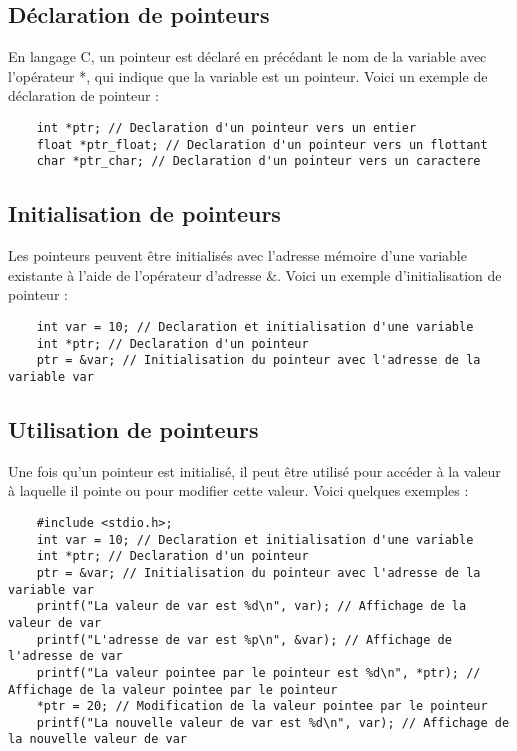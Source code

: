\subsection{Déclaration de pointeurs}

En langage C, un pointeur est déclaré en précédant le nom de la variable avec l'opérateur *, qui indique que la variable est un pointeur. Voici un exemple de déclaration de pointeur :

\begin{lstlisting}
	int *ptr; // Declaration d'un pointeur vers un entier
	float *ptr_float; // Declaration d'un pointeur vers un flottant
	char *ptr_char; // Declaration d'un pointeur vers un caractere
\end{lstlisting}

\subsection{Initialisation de pointeurs}

Les pointeurs peuvent être initialisés avec l'adresse mémoire d'une variable existante à l'aide de l'opérateur d'adresse \&. Voici un exemple d'initialisation de pointeur :

\begin{lstlisting}
	int var = 10; // Declaration et initialisation d'une variable
	int *ptr; // Declaration d'un pointeur
	ptr = &var; // Initialisation du pointeur avec l'adresse de la variable var
\end{lstlisting}

\subsection{Utilisation de pointeurs}

Une fois qu'un pointeur est initialisé, il peut être utilisé pour accéder à la valeur à laquelle il pointe ou pour modifier cette valeur. Voici quelques exemples :

\begin{lstlisting}
	#include <stdio.h>;
	int var = 10; // Declaration et initialisation d'une variable
	int *ptr; // Declaration d'un pointeur
	ptr = &var; // Initialisation du pointeur avec l'adresse de la variable var
	printf("La valeur de var est %d\n", var); // Affichage de la valeur de var
	printf("L'adresse de var est %p\n", &var); // Affichage de l'adresse de var
	printf("La valeur pointee par le pointeur est %d\n", *ptr); // Affichage de la valeur pointee par le pointeur
	*ptr = 20; // Modification de la valeur pointee par le pointeur
	printf("La nouvelle valeur de var est %d\n", var); // Affichage de la nouvelle valeur de var
\end{lstlisting}

